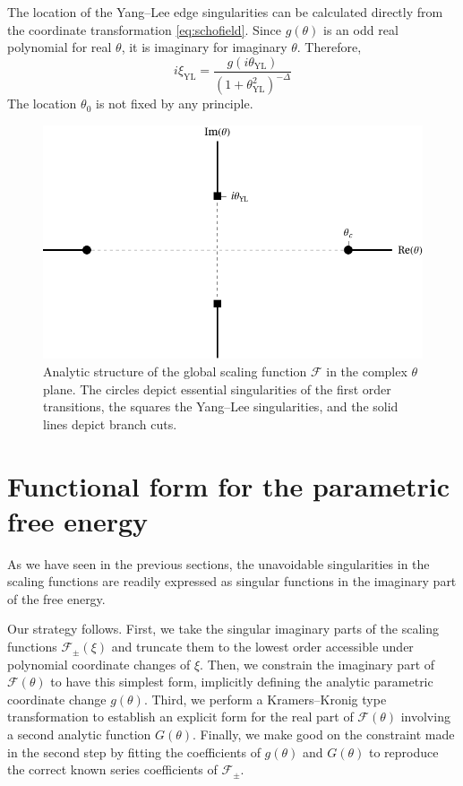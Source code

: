 \documentclass[
aps,
pre,
preprint,
longbibliography,
floatfix
]{revtex4-2}
\begin{document}
The location of the Yang--Lee edge singularities can be calculated directly
from the coordinate transformation \eqref{eq:schofield}. Since $g(\theta)$ is
an odd real polynomial for real $\theta$, it is imaginary for imaginary
$\theta$. Therefore,
\begin{equation} \label{eq:yang-lee.theta}
  i\xi_{\mathrm{YL}}=\frac{g(i\theta_{\mathrm{YL}})}{(1+\theta_{\mathrm{YL}}^2)^{-\Delta}}
\end{equation}
The location $\theta_0$ is not fixed by any principle.

\begin{figure}
  \includegraphics{figs/F_theta_singularities.pdf}
  \caption{
    Analytic structure of the global scaling function $\mathcal F$ in the
    complex $\theta$ plane. The circles depict essential singularities of the
    first order transitions, the squares the Yang--Lee singularities, and the
    solid lines depict branch cuts.
  } \label{fig:schofield.singularities}
\end{figure}

\section{Functional form for the parametric free energy}

As we have seen in the previous sections, the unavoidable singularities in the
scaling functions are readily expressed as singular functions in the imaginary
part of the free energy.

Our strategy follows. First, we take the singular imaginary parts of the
scaling functions $\mathcal F_{\pm}(\xi)$ and truncate them to the lowest order
accessible under polynomial coordinate changes of $\xi$. Then, we constrain
the imaginary part of $\mathcal F(\theta)$ to have this simplest form,
implicitly defining the analytic parametric coordinate change $g(\theta)$. Third, we perform a
Kramers--Kronig type transformation to establish an explicit form for the real
part of $\mathcal F(\theta)$ involving a second analytic function $G(\theta)$. Finally, we make good on the constraint made in
the second step by fitting the coefficients of $g(\theta)$ and $G(\theta)$ to reproduce the
correct known series coefficients of $\mathcal F_{\pm}$.
\end{document}
